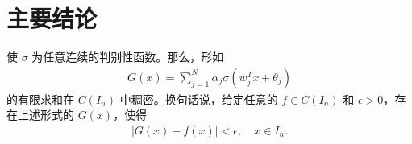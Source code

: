 \documentclass[12pt]{article}
\begin{document}
\section{主要结论}

\begin{mytheorem}
    使 $\sigma$ 为任意连续的判别性函数。那么，形如
    \begin{align}
        G(x)=\sum_{j=1}^N \alpha_j \sigma (w_j^T x +\theta_j)
    \end{align}
    的有限求和在 $C(I_n)$ 中稠密。换句话说，给定任意的 $f\in C(I_n)$ 和 $\epsilon>0$，存在上述形式的 $G(x)$，使得\begin{align*}
        |G(x)-f(x)|<\epsilon, \quad x\in I_n.    \end{align*}
\end{mytheorem}
\end{document}
